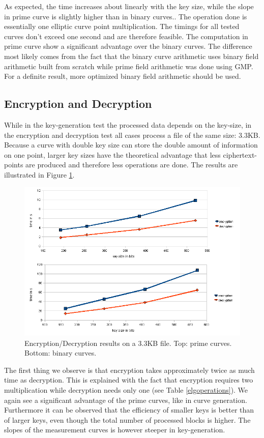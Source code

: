 \documentclass[11pt,english]{article}
\begin{document}
As expected, the time increases about linearly with the key size, while the slope in prime curve is slightly higher than in binary curves.. The operation done is essentially one elliptic curve point multiplication. The timings for all tested curves don't exceed one second and are therefore feasible. The computation in prime curve show a significant advantage over the binary curves. The difference most likely comes from the fact that the binary curve arithmetic uses binary field arithmetic built from scratch while prime field arithmetic was done using GMP. For a definite result, more optimized binary field arithmetic should be used.

\subsection{Encryption and Decryption}
While in the key-generation test the processed data depends on the key-size, in the encryption and decryption test all cases process a file of the same size: 3.3KB. Because a curve with double key size can store the double amount of information on one point, larger key sizes have the theoretical advantage that less ciphertext-points are produced and therefore less operations are done. The results are illustrated in Figure \ref{figure:encdec}.

\label{encdecres}
\begin{figure}[h]
\centering
\includegraphics[scale=0.6]{dia2.png}
\caption{Encryption/Decryption results on a 3.3KB file. Top: prime curves. Bottom: binary curves.}
\label{figure:encdec}
\end{figure}

The first thing we observe is that encryption takes approximately twice as much time as decryption. This is explained with the fact that encryption requires two multiplication while decryption needs only one (see Table \ref{elgoperations}). We again see a significant advantage of the prime curves, like in curve generation. Furthermore it can be observed that the efficiency of smaller keys is better than of larger keys, even though the total number of processed blocks is higher. The slopes of the measurement curves is however steeper in key-generation.
\end{document}
